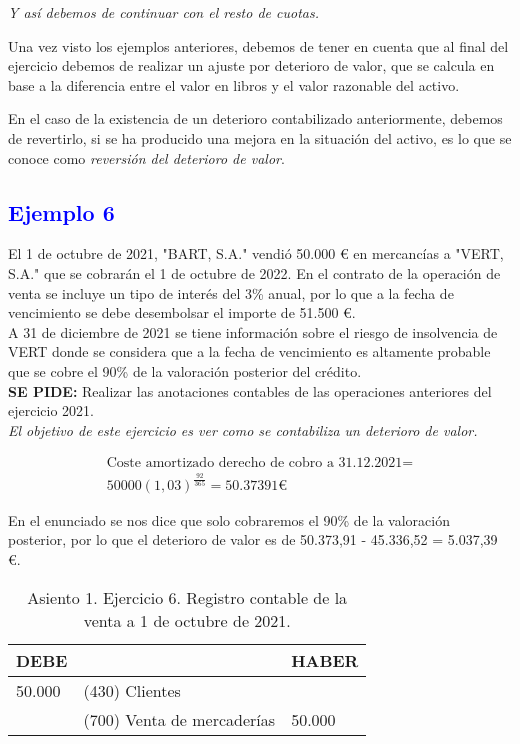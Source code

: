 \textit{Y así debemos de continuar con el resto de cuotas.}

Una vez visto los ejemplos anteriores, debemos de tener en cuenta que al final del ejercicio debemos de realizar un ajuste por deterioro de valor, que se calcula en base a la diferencia entre el valor en libros y el valor razonable del activo.

En el caso de la existencia de un deterioro contabilizado anteriormente, debemos de revertirlo, si se ha producido una mejora en la situación del activo, es lo que se conoce como \textit{reversión del deterioro de valor}.

\subsection*{\textcolor{blue}{Ejemplo 6}}
El 1 de octubre de 2021, "BART, S.A." vendió 50.000 € en mercancías a "VERT, S.A." que se cobrarán el 1 de octubre de 2022. En el contrato de la operación de venta se incluye un tipo de interés del 3\% anual, por lo que a la fecha de vencimiento se debe desembolsar el importe de 51.500 €.\\

A 31 de diciembre de 2021 se tiene información sobre el riesgo de insolvencia de VERT donde se considera que a la fecha de vencimiento es altamente probable que se cobre el 90\% de la valoración posterior del crédito.\\

\textbf{SE PIDE:} Realizar las anotaciones contables de las operaciones anteriores del ejercicio 2021.\\

\textit{El objetivo de este ejercicio es ver como se contabiliza un deterioro de valor.}

\begin{align*}
    \text{Coste amortizado derecho de cobro a 31.12.2021} = \\
    50000(1,03)^{\frac{92}{365}} = 50.37391 €
\end{align*}

En el enunciado se nos dice que solo cobraremos el 90\% de la valoración posterior, por lo que el deterioro de valor es de 50.373,91 - 45.336,52 = 5.037,39 €.

\begin{table}[H]
    \centering
    \begin{tabular}{|p{3cm}|p{6cm}|p{3cm}|}
    \hline
    \rowcolor{blue!30}
    \textbf{DEBE} & \textbf{} & \textbf{HABER} \\
    \hline
    50.000 & (430) Clientes &  \\
    \hline
     & (700) Venta de mercaderías & 50.000 \\
    \hline
    \end{tabular}
    \caption{Asiento 1. Ejercicio 6. Registro contable de la venta a 1 de octubre de 2021.}
    \label{tabla:asiento1ej6}
\end{table}

